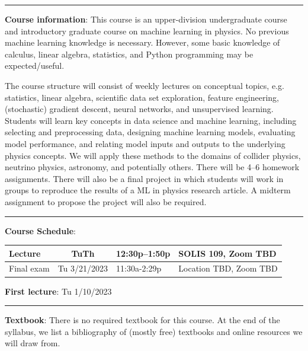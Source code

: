 \documentclass[12pt]{article}
\begin{document}
\begin{center}
  \rule{\textwidth}{0.5pt}
\end{center}

\noindent\textbf{Course information}: This course is an upper-division undergraduate course and introductory graduate course on machine learning in physics.
No previous machine learning knowledge is necessary.
However, some basic knowledge of calculus, linear algebra, statistics, and Python programming may be expected/useful.

The course structure will consist of weekly lectures on conceptual topics, e.g. statistics, linear algebra, scientific data set exploration, feature engineering, (stochastic) gradient descent, neural networks, and unsupervised learning.
Students will learn key concepts in data science and machine learning, including selecting and preprocessing data, designing machine learning models, evaluating model performance, and relating model inputs and outputs to the underlying physics concepts.
We will apply these methods to the domains of collider physics, neutrino physics, astronomy, and potentially others.
There will be 4--6 homework assignments.
There will also be a final project in which students will work in groups to reproduce the results of a ML in physics research article.
A midterm assignment to propose the project will also be required.

\begin{center}
  \rule{\textwidth}{0.5pt}
\end{center}

\noindent\textbf{Course Schedule}:
\begin{center}
  \begin{tabular}{|l|c|l|m{50mm}|}
    \hline
    Lecture    & TuTh         & 12:30p--1:50p & SOLIS 109, Zoom TBD    \\\hline
    Final exam & Tu 3/21/2023 & 11:30a-2:29p  & Location TBD, Zoom TBD \\\hline
  \end{tabular}
\end{center}

\noindent\textbf{First lecture}: Tu 1/10/2023

\begin{center}
  \rule{\textwidth}{0.5pt}
\end{center}

\noindent\textbf{Textbook}: There is no required textbook for this course.
At the end of the syllabus, we list a bibliography of (mostly free) textbooks and online resources we will draw from.
\end{document}
